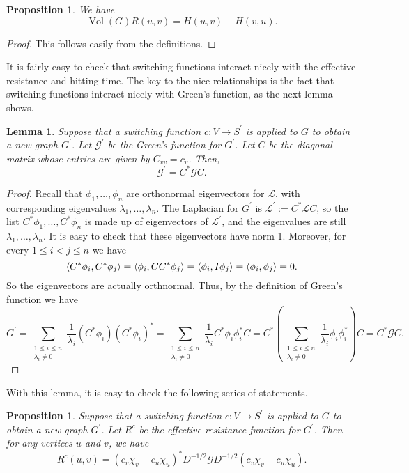 \documentclass[12pt]{article}
\newtheorem{prop}[thm]{Proposition}
\newtheorem{lem}[thm]{Lemma}
\theoremstyle{definition}
\DeclareMathOperator{\vol}{Vol}
\newcommand{\lap}{\mathcal{L}}
\newcommand{\green}{\mathcal{G}}
\DeclarePairedDelimiter\inner{\langle}{\rangle}
\begin{document}
\begin{prop}
We have $$\vol(G) R(u, v) = H(u, v) + H(v, u).$$
\end{prop}
\begin{proof}
This follows easily from the definitions.
\end{proof}

It is fairly easy to check that switching functions interact nicely with the effective resistance and hitting time. The key to the nice relationships is the fact that switching functions interact nicely with Green's function, as the next lemma shows.

\begin{lem}
Suppose that a switching function $c: V \rightarrow S^\prime$ is applied to $G$ to obtain a new graph $G^\prime$. Let $\green^\prime$ be the Green's function for $G^\prime$. Let $C$ be the diagonal matrix whose entries are given by $C_{vv} = c_v$. Then, $$\green^\prime = C^* \green C.$$
\end{lem}
\begin{proof}
Recall that $\phi_1, \dots, \phi_n$ are orthonormal eigenvectors for $\lap$, with corresponding eigenvalues $\lambda_1, \dots, \lambda_n$. The Laplacian for $G^\prime$ is $\lap^\prime := C^* \lap C$, so the list $C^* \phi_1, \dots, C^* \phi_n$ is made up of eigenvectors of $\lap^\prime$, and the eigenvalues are still $\lambda_1, \dots, \lambda_n$. It is easy to check that these eigenvectors have norm 1. Moreover, for every $1 \leq i < j \leq n$ we have
$$
\inner*{C^* \phi_i, C^* \phi_j} = \inner*{\phi_i, C C^* \phi_j} = \inner*{\phi_i, I \phi_j} = \inner*{\phi_i, \phi_j} = 0.
$$
So the eigenvectors are actually orthnormal. Thus, by the definition of Green's function we have
$$
G^\prime = \sum_{\substack{1 \leq i \leq n \\ \lambda_i \neq 0}} \frac{1}{\lambda_i} \left( C^* \phi_i \right) \left( C^* \phi_i \right)^*
= \sum_{\substack{1 \leq i \leq n \\ \lambda_i \neq 0}} \frac{1}{\lambda_i} C^* \phi_i \phi_i^* C
= C^* \left( \sum_{\substack{1 \leq i \leq n \\ \lambda_i \neq 0}} \frac{1}{\lambda_i} \phi_i \phi_i^* \right) C
= C^* \green C.
$$
\end{proof}

With this lemma, it is easy to check the following series of statements.

\begin{prop}
Suppose that a switching function $c: V \rightarrow S^\prime$ is applied to $G$ to obtain a new graph $G^\prime$. Let $R^c$ be the effective resistance function for $G^\prime$. Then for any vertices $u$ and $v$, we have $$R^c(u, v) = (c_v \chi_v - c_u \chi_u)^* D^{-1/2} \green D^{-1/2} (c_v \chi_v - c_u \chi_u).$$
\end{prop}
\end{document}
